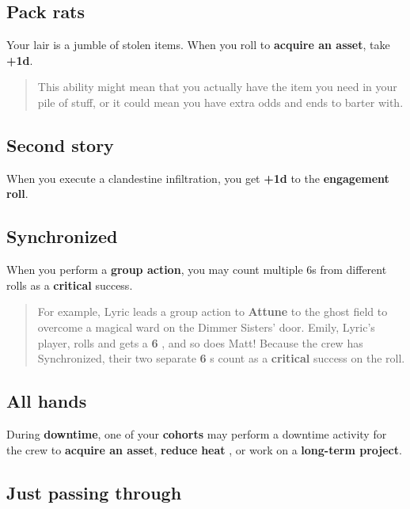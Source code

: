 \documentclass[11pt,fleqn,a5paper]{book}
\newcommand{\gameterm}[1]{\textbf{#1}}
\begin{document}
\subsection{Pack rats}

Your lair is a jumble of stolen items. When you roll to \textbf{acquire an asset}, take \textbf{+1d}.

\begin{quote}
	This ability might mean that you actually have the item you need in your pile of stuff, or it could mean you have extra odds and ends to barter with.
\end{quote} 

\subsection{Second story}

When you execute a clandestine infiltration, you get \textbf{+1d} to the \textbf{engagement roll}.

\subsection{Synchronized}

When you perform a \textbf{group action}, you may count multiple 6s from different rolls as a \gameterm{critical}  success.

\begin{quote}
	For example, Lyric leads a group action to \gameterm{Attune}  to the ghost field to overcome a magical ward on the Dimmer Sisters’ door. Emily, Lyric’s player, rolls and gets a \gameterm{6} , and so does Matt! Because the crew has Synchronized, their two separate \gameterm{6} s count as a \gameterm{critical}  success on the roll.
\end{quote} 

\subsection{All hands}

During \textbf{downtime}, one of your \textbf{cohorts} may perform a downtime activity for the crew to \textbf{acquire an asset}, \textbf{reduce} \gameterm{heat} , or work on a \textbf{long-term project}.

\subsection{Just passing through}
\end{document}

